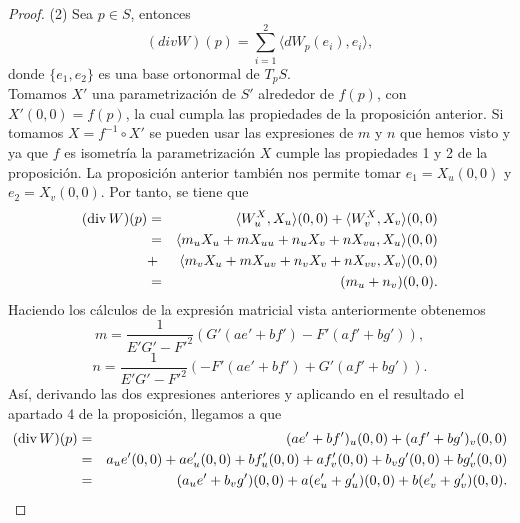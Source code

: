 \begin{proof}
	(2)  Sea $p \in S$, entonces
	${ }$\\
	\[
		(div W)(p) = \sum_{i=1}^{2}\langle dW_p(e_i), e_i \rangle,
	\]
	${ }$\\
	donde $\{e_1, e_2\}$ es una base ortonormal de $T_p S$.
	${ }$\\
	
	Tomamos $X'$ una parametrización de $S'$ alrededor de $f(p)$, con $X'(0,0) = f(p)$, la cual cumpla las propiedades de la proposición anterior. Si tomamos $X = f^{-1} \circ X'$ se pueden usar las expresiones de $m$ y $n$ que hemos visto y ya que $f$ es isometría la parametrización $X$ cumple las propiedades 1 y 2 de la proposición. La proposición anterior también nos permite tomar $e_1 = X_u(0,0)$ y $e_2 = X_v(0,0)$. Por tanto, se tiene que
	${ }$\\
		\begin{eqnarray*}
		(\hbox{div}\,W)(p)&=&\langle W^X_u,X_u\rangle(0,0)+\langle W^X_v,X_v\rangle(0,0)\\
		&=&\langle m_uX_u+mX_{uu}+n_uX_v+nX_{vu},X_u\rangle(0,0)\\
		&+&\langle m_vX_u+mX_{uv}+n_vX_v+nX_{vv},X_v\rangle(0,0)\\
		&=&(m_u+n_v)(0,0).
		\end{eqnarray*}
	${ }$\\
	
	Haciendo los cálculos de la expresión matricial vista anteriormente obtenemos
	${ }$\\
	
	\[
		m = \frac{1}{E'G' - F'^2} (G'(ae' + bf') - F'(af' + bg')),
	\]
	\[
		n = \frac{1}{E'G' - F'^2} (-F'(ae' + bf') + G'(af' + bg')).
	\]
	${ }$\\
	
	Así, derivando las dos expresiones anteriores y aplicando en el resultado el apartado 4 de la proposición, llegamos a que
	${ }$\\
	\begin{eqnarray*}
		(\hbox{div}\,W)(p)&=&(ae'+bf')_u(0,0)+(af'+bg')_v(0,0)\\
		&=& a_ue'(0,0)+ae'_u(0,0)+bf'_u(0,0)+af'_v(0,0)+b_vg'(0,0)+bg'_v(0,0)\\
		&=& (a_ue'+b_vg')(0,0)+a(e'_u+g'_u)(0,0)+b(e'_v+g'_v)(0,0).
	\end{eqnarray*}
	${ }$\\
	

\end{proof}
